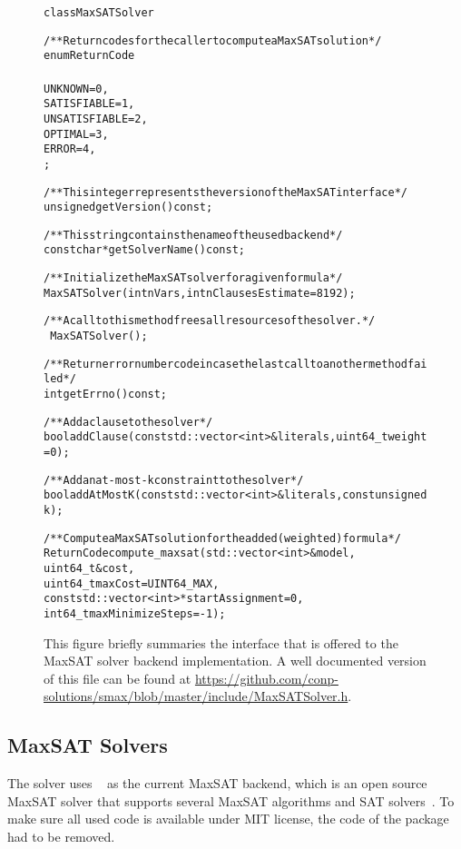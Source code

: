 \documentclass[conference]{IEEEtran}
\begin{document}
\begin{figure*}[t]
\centering
\begin{alltt}
class MaxSATSolver {

    /** Return codes for the caller to compute a MaxSAT solution */
    enum ReturnCode
    {
        UNKNOWN = 0,
        SATISFIABLE = 1,
        UNSATISFIABLE = 2,
        OPTIMAL = 3,
        ERROR = 4,
    };

    /** This integer represents the version of the MaxSAT interface */
    unsigned getVersion () const;

    /** This string contains the name of the used backend */
    const char* getSolverName () const;

    /** Initialize the MaxSAT solver for a given formula */
    MaxSATSolver(int nVars, int nClausesEstimate = 8192);
    
    /** A call to this method frees all resources of the solver. */
    ~MaxSATSolver();

    /** Return error number code in case the last call to another method failed */
    int getErrno() const;

    /** Add a clause to the solver */
    bool addClause(const std::vector<int> &literals, uint64_t weight = 0);
    
    /** Add an at-most-k constraint to the solver */
    bool addAtMostK(const std::vector<int> &literals, const unsigned k);
    
    /** Compute a MaxSAT solution for the added (weighted) formula */
    ReturnCode compute_maxsat(std::vector<int> &model,
                              uint64_t &cost,
                              uint64_t maxCost = UINT64_MAX,
                              const std::vector<int> *startAssignment = 0,
                              int64_t maxMinimizeSteps = -1);
}

\end{alltt}
\caption{This figure briefly summaries the interface that is offered to the MaxSAT solver backend implementation.
A well documented version of this file can be found at \url{https://github.com/conp-solutions/smax/blob/master/include/MaxSATSolver.h}.}\label{fig:interface}
\end{figure*}

\subsection{MaxSAT Solvers}

The solver uses \openwbo~\cite{martins-sat14} as the current MaxSAT backend, which is an open source MaxSAT solver that supports several MaxSAT algorithms and SAT solvers~\cite{minisat-sat03,audemard-ijcai09,mergesat}.
To make sure all used code is available under MIT license, the \glucose code of the \openwbo package had to be removed.
\end{document}
